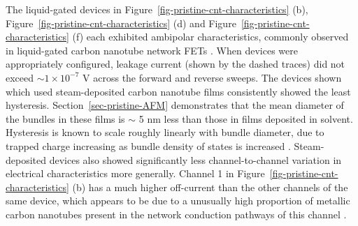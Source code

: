 \documentclass[
  a4paper,
]{scrbook}
\begin{document}
The liquid-gated devices in
Figure~\ref{fig-pristine-cnt-characteristics} (b),
Figure~\ref{fig-pristine-cnt-characteristics} (d) and
Figure~\ref{fig-pristine-cnt-characteristics} (f) each exhibited
ambipolar characteristics, commonly observed in liquid-gated carbon
nanotube network FETs
\autocite{Kauffman2008,Heller2009,JongYu2009,Derenskyi2014,Murugathas2018,Albarghouthi2022}.
When devices were appropriately configured, leakage current (shown by
the dashed traces) did not exceed \(\sim 1 \times 10^{-7}\) V across the
forward and reverse sweeps. The devices shown which used steam-deposited
carbon nanotube films consistently showed the least hysteresis.
Section~\ref{sec-pristine-AFM} demonstrates that the mean diameter of
the bundles in these films is \(\sim\) 5 nm less than those in films
deposited in solvent. Hysteresis is known to scale roughly linearly with
bundle diameter, due to trapped charge increasing as bundle density of
states is increased \autocite{Pop2009}. Steam-deposited devices also
showed significantly less channel-to-channel variation in electrical
characteristics more generally. Channel 1 in
Figure~\ref{fig-pristine-cnt-characteristics} (b) has a much higher
off-current than the other channels of the same device, which appears to
be due to a unusually high proportion of metallic carbon nanotubes
present in the network conduction pathways of this channel
\autocite{Rouhi2011,Zaumseil2015}.
\end{document}
